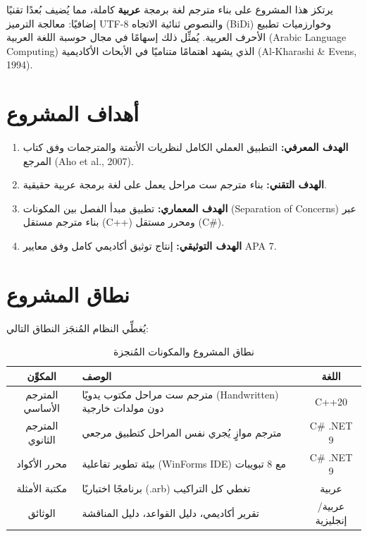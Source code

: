 \documentclass[12pt,a4paper]{report}
\begin{document}
يرتكز هذا المشروع على بناء مترجم لغة برمجة \textbf{عربية} كاملة، مما يُضيف بُعدًا تقنيًا إضافيًا: معالجة الترميز UTF-8 والنصوص ثنائية الاتجاه (BiDi) وخوارزميات تطبيع الأحرف العربية. يُمثِّل ذلك إسهامًا في مجال حوسبة اللغة العربية (Arabic Language Computing) الذي يشهد اهتمامًا متناميًا في الأبحاث الأكاديمية (Al-Kharashi \& Evens, 1994).

\section{أهداف المشروع}

\begin{enumerate}[label=\textbf{\arabic*.}, rightmargin=0.5cm]
    \item \textbf{الهدف المعرفي:} التطبيق العملي الكامل لنظريات الأتمتة والمترجمات وفق كتاب المرجع (Aho et al., 2007).
    \item \textbf{الهدف التقني:} بناء مترجم ست مراحل يعمل على لغة برمجة عربية حقيقية.
    \item \textbf{الهدف المعماري:} تطبيق مبدأ الفصل بين المكونات (Separation of Concerns) عبر بناء مترجم مستقل (C++) ومحرر مستقل (C#).
    \item \textbf{الهدف التوثيقي:} إنتاج توثيق أكاديمي كامل وفق معايير APA 7.
\end{enumerate}

\section{نطاق المشروع}

يُغطِّي النظام المُنجَز النطاق التالي:

\begin{table}[H]
\caption{\arabicfont نطاق المشروع والمكونات المُنجزة}
\label{tab:scope}
\centering
\begin{tabularx}{\textwidth}{|c|X|c|}
\hline
\rowcolor{TableHead}
\textbf{\arabicfont المكوِّن} & \textbf{\arabicfont الوصف} & \textbf{\arabicfont اللغة} \\
\hline
\arabicfont المترجم الأساسي & \arabicfont مترجم ست مراحل مكتوب يدويًا (Handwritten) دون مولدات خارجية & C++20 \\
\hline
\rowcolor{TableAlt}
\arabicfont المترجم الثانوي & \arabicfont مترجم موازٍ يُجري نفس المراحل كتطبيق مرجعي & C\# .NET 9 \\
\hline
\arabicfont محرر الأكواد & \arabicfont بيئة تطوير تفاعلية (WinForms IDE) مع 8 تبويبات & C\# .NET 9 \\
\hline
\rowcolor{TableAlt}
\arabicfont مكتبة الأمثلة & \arabicfont 12 برنامجًا اختباريًا (.arb) تغطي كل التراكيب & \arabicfont عربية \\
\hline
\arabicfont الوثائق & \arabicfont تقرير أكاديمي، دليل القواعد، دليل المناقشة & \arabicfont عربية/إنجليزية \\
\hline
\end{tabularx}
\end{table}
\end{document}
